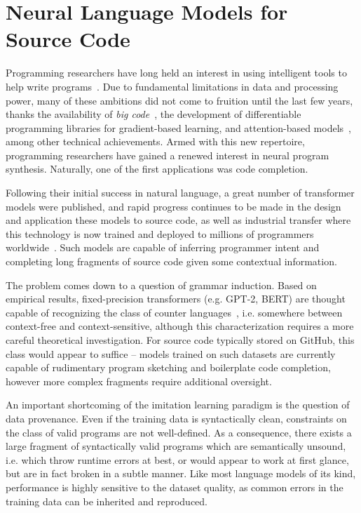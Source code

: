 \documentclass[10pt]{article}
\begin{document}
  \section{Neural Language Models for Source Code}

Programming researchers have long held an interest in using intelligent tools to help write programs~\cite{bras1993artificial}. Due to fundamental limitations in data and processing power, many of these ambitions did not come to fruition until the last few years, thanks the availability of \textit{big code}~\cite{allamanis2018survey}, the development of differentiable programming libraries for gradient-based learning, and attention-based models~\cite{vaswani2017attention}, among other technical achievements. Armed with this new repertoire, programming researchers have gained a renewed interest in neural program synthesis. Naturally, one of the first applications was code completion.

 Following their initial success in natural language, a great number of transformer models were published, and rapid progress continues to be made in the design and application these models to source code, as well as industrial transfer where this technology is now trained and deployed to millions of programmers worldwide~\cite{chen2021evaluating}. Such models are capable of inferring programmer intent and completing long fragments of source code given some contextual information.

The problem comes down to a question of grammar induction. Based on empirical results, fixed-precision transformers (e.g. GPT-2, BERT) are thought capable of recognizing the class of counter languages~\cite{bhattamishra2020ability}, i.e. somewhere between context-free and context-sensitive, although this characterization requires a more careful theoretical investigation. For source code typically stored on GitHub, this class would appear to suffice -- models trained on such datasets are currently capable of rudimentary program sketching and boilerplate code completion, however more complex fragments require additional oversight.

An important shortcoming of the imitation learning paradigm is the question of data provenance. Even if the training data is syntactically clean, constraints on the class of valid programs are not well-defined. As a consequence, there exists a large fragment of syntactically valid programs which are semantically unsound, i.e. which throw runtime errors at best, or would appear to work at first glance, but are in fact broken in a subtle manner. Like most language models of its kind, performance is highly sensitive to the dataset quality, as common errors in the training data can be inherited and reproduced.
\end{document}
